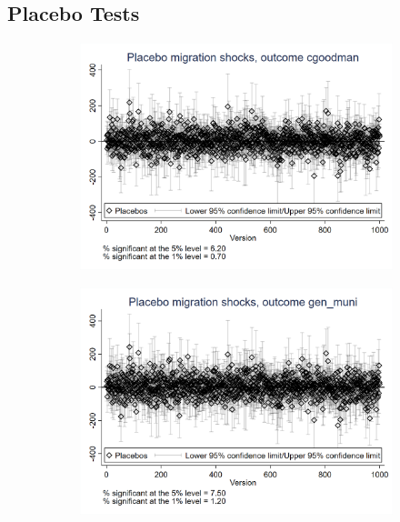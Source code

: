 \documentclass{article}
\begin{document}
\subsection{Placebo Tests}
\begin{figure}[htbp]
    \centering
    \begin{subfigure}{0.3\textwidth}
        \includegraphics[width=\linewidth]{exhibits_old/figures/exogeneity_tests/D17_placebo_cgoodman_urban.png}
        \label{fig:sub1}
    \end{subfigure}
    \begin{subfigure}{0.3\textwidth}
        \includegraphics[width=\linewidth]{exhibits_old/figures/exogeneity_tests/D17_placebo_gen_muni_urban.png}
        \label{fig:sub2}

\end{subfigure}
\end{figure}
\end{document}
